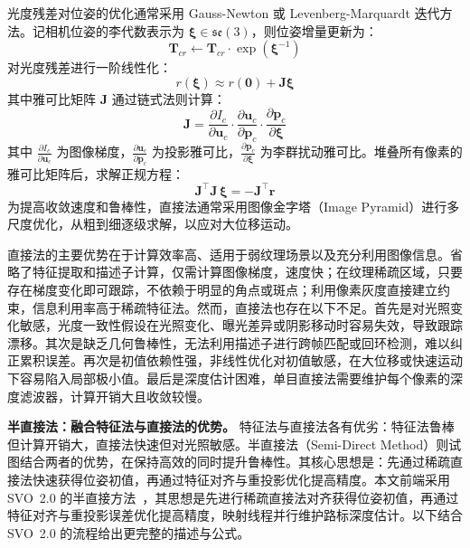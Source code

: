 光度残差对位姿的优化通常采用 Gauss-Newton 或 Levenberg-Marquardt 迭代方法。记相机位姿的李代数表示为 $\boldsymbol{\xi} \in \mathfrak{se}(3)$，则位姿增量更新为：
\begin{equation}
    \mathbf{T}_{cr} \leftarrow \mathbf{T}_{cr} \cdot \exp(\boldsymbol{\xi}^{-1})
\end{equation}
对光度残差进行一阶线性化：
\begin{equation}
    r(\boldsymbol{\xi}) \approx r(\mathbf{0}) + \mathbf{J} \boldsymbol{\xi}
\end{equation}
其中雅可比矩阵 $\mathbf{J}$ 通过链式法则计算：
\begin{equation}
    \mathbf{J} = \frac{\partial I_c}{\partial \mathbf{u}_c} \cdot \frac{\partial \mathbf{u}_c}{\partial \mathbf{p}_c} \cdot \frac{\partial \mathbf{p}_c}{\partial \boldsymbol{\xi}}
\end{equation}
其中 $\frac{\partial I_c}{\partial \mathbf{u}_c}$ 为图像梯度，$\frac{\partial \mathbf{u}_c}{\partial \mathbf{p}_c}$ 为投影雅可比，$\frac{\partial \mathbf{p}_c}{\partial \boldsymbol{\xi}}$ 为李群扰动雅可比。堆叠所有像素的雅可比矩阵后，求解正规方程：
\begin{equation}
    \mathbf{J}^\top \mathbf{J} \, \boldsymbol{\xi} = -\mathbf{J}^\top \mathbf{r}
\end{equation}
为提高收敛速度和鲁棒性，直接法通常采用图像金字塔（Image Pyramid）进行多尺度优化，从粗到细逐级求解，以应对大位移运动。

直接法的主要优势在于计算效率高、适用于弱纹理场景以及充分利用图像信息。省略了特征提取和描述子计算，仅需计算图像梯度，速度快；在纹理稀疏区域，只要存在梯度变化即可跟踪，不依赖于明显的角点或斑点；利用像素灰度直接建立约束，信息利用率高于稀疏特征法。然而，直接法也存在以下不足。首先是对光照变化敏感，光度一致性假设在光照变化、曝光差异或阴影移动时容易失效，导致跟踪漂移。其次是缺乏几何鲁棒性，无法利用描述子进行跨帧匹配或回环检测，难以纠正累积误差。再次是初值依赖性强，非线性优化对初值敏感，在大位移或快速运动下容易陷入局部极小值。最后是深度估计困难，单目直接法需要维护每个像素的深度滤波器，计算开销大且收敛较慢。

\textbf{半直接法：融合特征法与直接法的优势。}
特征法与直接法各有优劣：特征法鲁棒但计算开销大，直接法快速但对光照敏感。半直接法（Semi-Direct Method）则试图结合两者的优势，在保持高效的同时提升鲁棒性。其核心思想是：先通过稀疏直接法快速获得位姿初值，再通过特征对齐与重投影优化提高精度。本文前端采用 SVO~2.0 的半直接方法~\cite{forster2017svo}，其思想是先进行稀疏直接法对齐获得位姿初值，再通过特征对齐与重投影误差优化提高精度，映射线程并行维护路标深度估计。以下结合 SVO~2.0 的流程给出更完整的描述与公式。

